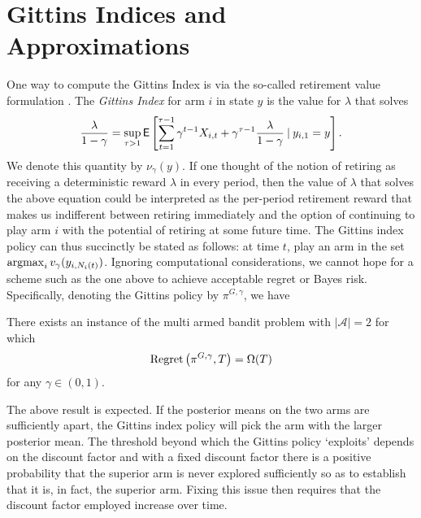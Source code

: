 \section{Gittins Indices and Approximations} \label{sec:gittins_and_approx}
One way to compute the Gittins Index is via the so-called retirement value formulation \cite{whittle1980multi}. The \emph{Gittins Index} for arm $i$ in state $y$ is the value for $\lambda$ that solves
\begin{equation} \label{eqn:gittins_index}
\frac{\lambda}{1-\gamma} = \sup_{\tau > 1}\mathsf{E}\left[\sum_{t=1}^{\tau-1} \gamma^{t-1} X_{i,t} + \gamma^{\tau-1} \frac{\lambda}{1-\gamma}
	\:\vert\: y_{i,1} = y
\right].
\end{equation}
We denote this quantity by $\nu_\gamma(y)$. If one thought of the notion of retiring as receiving a deterministic reward $\lambda$ in every period, then the value of $\lambda$ that solves the above equation could be interpreted as the per-period retirement reward that makes us indifferent between retiring immediately and the option of continuing to play arm $i$ with the potential of retiring at some future time. The Gittins index policy can thus succinctly be stated as follows: at time $t$, play an arm in the set $\operatorname*{\mathrm{argmax}}_{i} v_\gamma(y_{i,N_i(t)})$. 
Ignoring computational considerations, we cannot hope for a scheme such as the one above to achieve acceptable regret or Bayes risk. Specifically, denoting the Gittins policy by $\pi^{G,\gamma}$, we have 

\begin{lemma}
	There exists an instance of the multi armed bandit problem with $|\mathcal A| = 2$ for which 
	\[
	{\rm Regret}\left(
	\pi^{G,\gamma},T
	\right)
	= 
	\Omega(T)
	\]
	for any $\gamma \in (0,1)$.
\end{lemma}

The above result is expected. If the posterior means on the two arms are sufficiently apart, the Gittins index policy will pick the arm with the larger posterior mean. The threshold beyond which the Gittins policy `exploits' depends on the discount factor and with a fixed discount factor there is a positive probability that the superior arm is never explored sufficiently so as to establish that it is, in fact, the superior arm. Fixing this issue then requires that the discount factor employed increase over time.

